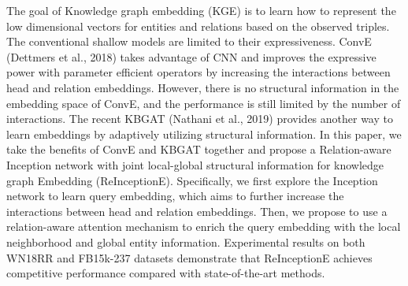 The goal of Knowledge graph embedding (KGE) is to learn how to represent the low dimensional vectors for entities and relations based on the observed triples. The conventional shallow models are limited to their expressiveness. ConvE (Dettmers et al., 2018) takes advantage of CNN and improves the expressive power with parameter efficient operators by increasing the interactions between head and relation embeddings. However, there is no structural information in the embedding space of ConvE, and the performance is still limited by the number of interactions. The recent KBGAT (Nathani et al., 2019) provides another way to learn embeddings by adaptively utilizing structural information. In this paper, we take the benefits of ConvE and KBGAT together and propose a Relation-aware Inception network with joint local-global structural information for knowledge graph Embedding (ReInceptionE). Specifically, we first explore the Inception network to learn query embedding, which aims to further increase the interactions between head and relation embeddings. Then, we propose to use a relation-aware attention mechanism to enrich the query embedding with the local neighborhood and global entity information. Experimental results on both WN18RR and FB15k-237 datasets demonstrate that ReInceptionE achieves competitive performance compared with state-of-the-art methods.
